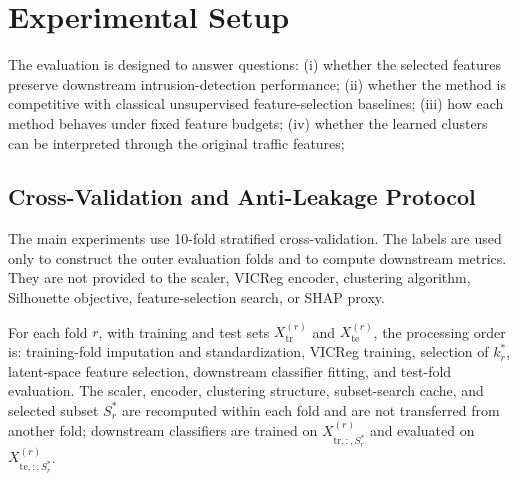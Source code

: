 \section{Experimental Setup}
\label{sec:setup}

The evaluation is designed to answer  questions: (i) whether the selected features preserve downstream intrusion-detection performance; (ii) whether the method is competitive with classical unsupervised feature-selection baselines; (iii) how each method behaves under fixed feature budgets; (iv) whether the learned clusters can be interpreted through the original traffic features; 

\subsection{Cross-Validation and Anti-Leakage Protocol}
\label{sec:cv}

The main experiments use 10-fold stratified cross-validation.  The labels are used only to construct the outer evaluation folds and to compute downstream metrics. They are not provided to the scaler, VICReg encoder, clustering algorithm, Silhouette objective, feature-selection search, or SHAP proxy.

For each fold $r$, with training and test sets $X^{(r)}_{\mathrm{tr}}$ and $X^{(r)}_{\mathrm{te}}$, the processing order is: training-fold imputation and standardization, VICReg training, selection of $k^{*}_r$, latent-space feature selection, downstream classifier fitting, and test-fold evaluation. The scaler, encoder, clustering structure, subset-search cache, and selected subset $S^{*}_r$ are recomputed within each fold and are not transferred from another fold; downstream classifiers are trained on $X^{(r)}_{\mathrm{tr},:,S^{*}_r}$ and evaluated on $X^{(r)}_{\mathrm{te},:,S^{*}_r}$. 

